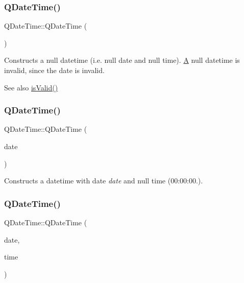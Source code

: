 \subsubsection{\texorpdfstring{QDateTime()}{QDateTime()}\hspace{0.1cm}{\footnotesize\ttfamily [1/3]}}
{\footnotesize\ttfamily Q\+Date\+Time\+::\+Q\+Date\+Time (\begin{DoxyParamCaption}{ }\end{DoxyParamCaption})\hspace{0.3cm}{\ttfamily [inline]}}

Constructs a null datetime (i.\+e. null date and null time). \mbox{\hyperlink{class_a}{A}} null datetime is invalid, since the date is invalid.

\begin{DoxySeeAlso}{See also}
\mbox{\hyperlink{class_q_date_time_aa10098d497d4561e20488cb324d314c6}{is\+Valid()}} 
\end{DoxySeeAlso}
\mbox{\label{class_q_date_time_a1da374c4242c84a1d228e572ab964dcf}} 
\subsubsection{\texorpdfstring{QDateTime()}{QDateTime()}\hspace{0.1cm}{\footnotesize\ttfamily [2/3]}}
{\footnotesize\ttfamily Q\+Date\+Time\+::\+Q\+Date\+Time (\begin{DoxyParamCaption}\item[{const \mbox{\hyperlink{class_q_date}{Q\+Date}} \&}]{date }\end{DoxyParamCaption})}

Constructs a datetime with date {\itshape date} and null time (00\+:00\+:00.). \mbox{\label{class_q_date_time_ac4b95956f346d9213b43624ec93e5625}} 
\subsubsection{\texorpdfstring{QDateTime()}{QDateTime()}\hspace{0.1cm}{\footnotesize\ttfamily [3/3]}}
{\footnotesize\ttfamily Q\+Date\+Time\+::\+Q\+Date\+Time (\begin{DoxyParamCaption}\item[{const \mbox{\hyperlink{class_q_date}{Q\+Date}} \&}]{date,  }\item[{const \mbox{\hyperlink{class_q_time}{Q\+Time}} \&}]{time }\end{DoxyParamCaption})}

